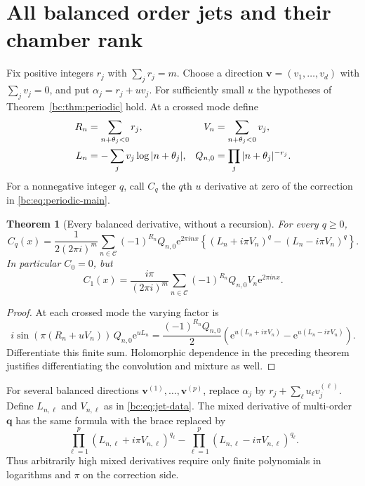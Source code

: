 \documentclass[11pt,letterpaper]{article}
\numberwithin{equation}{section}
\newtheorem{theorem}{Theorem}[section]
\theoremstyle{definition}
\theoremstyle{remark}
\newcommand{\bcC}{\mathcal C}
\newcommand{\bce}{\mathrm e}
\begin{document}
\section{All balanced order jets and their chamber rank}
\label{bc:sec:jets}

Fix positive integers $r_j$ with $\sum_jr_j=m$. Choose a direction
$\bm v=(v_1,\ldots,v_d)$ with $\sum_jv_j=0$, and put
$\alpha_j=r_j+uv_j$. For sufficiently small $u$ the hypotheses of
Theorem~\ref{bc:thm:periodic} hold. At a crossed mode define
\begin{align}
 R_n&=\sum_{n+\theta_j<0}r_j,&
 V_n&=\sum_{n+\theta_j<0}v_j,\notag\\
 L_n&=-\sum_jv_j\log|n+\theta_j|,&
 Q_{n,0}&=\prod_j|n+\theta_j|^{-r_j}.
 \label{bc:eq:jet-data}
\end{align}
For a nonnegative integer $q$, call $C_q$ the $q$th $u$ derivative at zero
of the correction in \eqref{bc:eq:periodic-main}.

\begin{theorem}[Every balanced derivative, without a recursion]
\label{bc:thm:jets}
For every $q\ge0$,
\begin{equation}\label{bc:eq:jet-main}
 C_q(x)=\frac1{2(2\pi i)^m}\sum_{n\in\bcC}
 (-1)^{R_n}Q_{n,0}\bce^{2\pi i n x}
 \left\{(L_n+i\pi V_n)^q-(L_n-i\pi V_n)^q\right\}.
\end{equation}
In particular $C_0=0$, but
\begin{equation}\label{bc:eq:first-jet}
 C_1(x)=\frac{i\pi}{(2\pi i)^m}\sum_{n\in\bcC}
             (-1)^{R_n}Q_{n,0}V_n\bce^{2\pi i n x}.
\end{equation}
\end{theorem}
\begin{proof}
At each crossed mode the varying factor is
\[
 i\sin(\pi(R_n+uV_n))\,Q_{n,0}\bce^{uL_n}
 =\frac{(-1)^{R_n}Q_{n,0}}2
     \left(\bce^{u(L_n+i\pi V_n)}
                  -\bce^{u(L_n-i\pi V_n)}\right).
\]
Differentiate this finite sum. Holomorphic dependence in the preceding
theorem justifies differentiating the convolution and mixture as well.
\end{proof}

For several balanced directions $\bm v^{(1)},\ldots,\bm v^{(p)}$, replace
$\alpha_j$ by $r_j+\sum_\ell u_\ell v_j^{(\ell)}$. Define $L_{n,\ell}$ and
$V_{n,\ell}$ as in \eqref{bc:eq:jet-data}. The mixed derivative of
multi-order $\bm q$ has the same formula with the brace replaced by
\begin{equation}\label{bc:eq:multi-jet}
 \prod_{\ell=1}^p(L_{n,\ell}+i\pi V_{n,\ell})^{q_\ell}
 -\prod_{\ell=1}^p(L_{n,\ell}-i\pi V_{n,\ell})^{q_\ell}.
\end{equation}
Thus arbitrarily high mixed derivatives require only finite
polynomials in logarithms and $\pi$ on the correction side.
\end{document}
